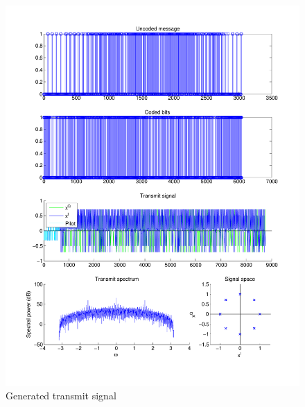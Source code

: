 \documentclass[11pt]{scrartcl}
\begin{document}
\begin{figure}
    \centering
    \includegraphics[width=1.0\textwidth]{figures/transmit.pdf}
    \caption{Generated transmit signal}
\end{figure}
\end{document}
